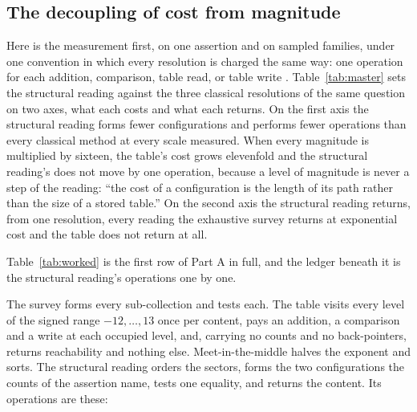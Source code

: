 \documentclass[pdflatex,sn-mathphys-num]{sn-jnl}
\theoremstyle{thmstyleone}%
\theoremstyle{thmstyletwo}%
\theoremstyle{thmstylethree}%
\newcommand{\q}[1]{``#1''}        %
\begin{document}
\subsection{The decoupling of cost from magnitude}
Here is the measurement first, on one assertion and on sampled families, under one convention in which every resolution is charged the same way: one operation for each addition, comparison, table read, or table write \citep{CookReckhow1973}. Table~\ref{tab:master} sets the structural reading against the three classical resolutions of the same question on two axes, what each costs and what each returns. On the first axis the structural reading forms fewer configurations and performs fewer operations than every classical method at every scale measured. When every magnitude is multiplied by sixteen, the table's cost grows elevenfold and the structural reading's does not move by one operation, because a level of magnitude is never a step of the reading: \q{the cost of a configuration is the length of its path rather than the size of a stored table.} On the second axis the structural reading returns, from one resolution, every reading the exhaustive survey returns at exponential cost and the table does not return at all.

\begin{table}[!htbp]
\centering\footnotesize
\caption{Master table. Part A: the cost of each resolution on the worked assertion and on sampled assertions of twelve and twenty contents with distinct magnitudes (means of 25), with its growth in $n$ and its growth when every magnitude is multiplied by sixteen at $n=12$ (Protocols~C.9--C.13). Part B: the readings each resolution supplies from its own output (Protocol~C.14).}
\label{tab:master}
\par\vspace{0.8em}

\end{table}

Table~\ref{tab:worked} is the first row of Part A in full, and the ledger beneath it is the structural reading's \workedStructOps{} operations one by one.

\begin{table}[!htbp]
\centering
\caption{One question, four resolutions, one convention. $X=\{-7,-3,-2,5,8\}$: which sub-collections exhaust to zero?}
\label{tab:worked}

\end{table}

The survey \citep{GareyJohnson1979} forms every sub-collection and tests each. The table \citep{Bellman1957} visits every level of the signed range $-12,\dots,13$ once per content, pays an addition, a comparison and a write at each occupied level, and, carrying no counts and no back-pointers, returns reachability and nothing else. Meet-in-the-middle \citep{HorowitzSahni1974} halves the exponent and sorts. The structural reading orders the sectors, forms the two configurations the counts of the assertion name, tests one equality, and returns the content. Its \workedStructOps{} operations are these:
\end{document}
